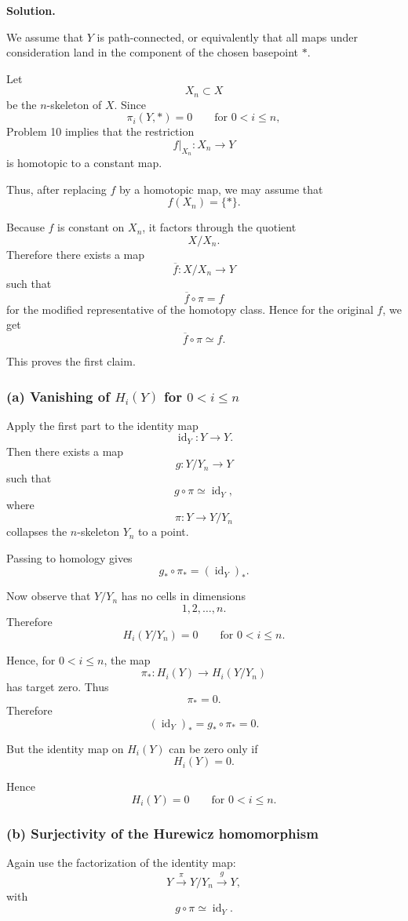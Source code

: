 \documentclass[12pt,a4paper]{article}
\theoremstyle{notespace}
\begin{document}
\textbf{Solution.}

We assume that \(Y\) is path-connected, or equivalently that all maps under consideration land in the component of the chosen basepoint \(*\).

Let
\[
X_n\subset X
\]
be the \(n\)-skeleton of \(X\). Since
\[
\pi_i(Y,*)=0
\qquad
\text{for }0<i\leq n,
\]
Problem 10 implies that the restriction
\[
f|_{X_n}:X_n\to Y
\]
is homotopic to a constant map.

Thus, after replacing \(f\) by a homotopic map, we may assume that
\[
f(X_n)=\{*\}.
\]

Because \(f\) is constant on \(X_n\), it factors through the quotient
\[
X/X_n.
\]
Therefore there exists a map
\[
\overline f:X/X_n\to Y
\]
such that
\[
\overline f\circ \pi=f
\]
for the modified representative of the homotopy class. Hence for the original \(f\), we get
\[
\boxed{
	\overline f\circ \pi\simeq f.
}
\]

This proves the first claim.

\subsubsection*{(a) Vanishing of \(H_i(Y)\) for \(0<i\leq n\)}

Apply the first part to the identity map
\[
\operatorname{id}_Y:Y\to Y.
\]
Then there exists a map
\[
g:Y/Y_n\to Y
\]
such that
\[
g\circ \pi\simeq \operatorname{id}_Y,
\]
where
\[
\pi:Y\to Y/Y_n
\]
collapses the \(n\)-skeleton \(Y_n\) to a point.

Passing to homology gives
\[
g_*\circ \pi_*=(\operatorname{id}_Y)_*.
\]

Now observe that \(Y/Y_n\) has no cells in dimensions
\[
1,2,\ldots,n.
\]
Therefore
\[
H_i(Y/Y_n)=0
\qquad
\text{for }0<i\leq n.
\]

Hence, for \(0<i\leq n\), the map
\[
\pi_*:H_i(Y)\to H_i(Y/Y_n)
\]
has target zero. Thus
\[
\pi_*=0.
\]
Therefore
\[
(\operatorname{id}_Y)_*
=
g_*\circ \pi_*
=
0.
\]

But the identity map on \(H_i(Y)\) can be zero only if
\[
H_i(Y)=0.
\]

Hence
\[
\boxed{
	H_i(Y)=0
	\qquad
	\text{for }0<i\leq n.
}
\]

\subsubsection*{(b) Surjectivity of the Hurewicz homomorphism}

Again use the factorization of the identity map:
\[
Y\xrightarrow{\pi}Y/Y_n\xrightarrow{g}Y,
\]
with
\[
g\circ \pi\simeq \operatorname{id}_Y.
\]
\end{document}
